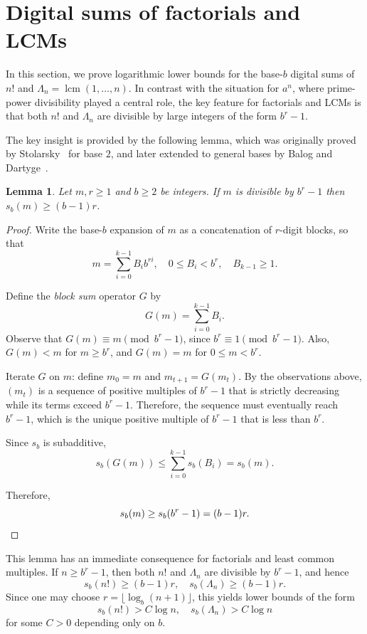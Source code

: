 \documentclass[12pt]{amsart}
\newtheorem{lemma}{Lemma}
\theoremstyle{remark}
\DeclareMathOperator{\lcm}{lcm}
\begin{document}
\section{Digital sums of factorials and LCMs}
\label{sec:digital-sums-factorials-lcms}
In this section, we prove logarithmic lower bounds for the base-$b$
digital sums of $n!$ and $\Lambda_n = \lcm(1,\ldots, n)$.
In contrast with the situation for $a^n$, where prime-power divisibility
played a central role, the key feature for factorials and LCMs
is that both $n!$ and $\Lambda_n$ are divisible by large integers
of the form $b^r - 1$.

The key insight is provided by the following lemma, which was
originally proved by Stolarsky~\cite{stolarsky1980} for base $2$,
and later extended to general bases by Balog and Dartyge~\cite{balog-dartyge2012}.

\begin{lemma} \label{lem:balog}
    Let $m, r \ge 1$ and $b \ge 2$ be integers.
    If $m$ is divisible by $b^r - 1$ then $s_b(m) \ge (b-1)r$.
\end{lemma}

\begin{proof}
    Write the base-$b$ expansion of $m$ as a concatenation of $r$-digit blocks,
    so that
    \[
        m = \sum_{i=0}^{k-1} B_i b^{ri}, \quad 0 \le B_i < b^r, \quad B_{k-1} \ge 1.
    \]

    Define the \emph{block sum} operator $G$ by
    \[
        G(m) = \sum_{i=0}^{k-1} B_i.
    \]
    Observe that
    $G(m) \equiv m \pmod{b^r - 1}$, since $b^r \equiv 1 \pmod{b^r - 1}$.
    Also, $G(m) < m$ for $m \ge b^r$, and $G(m) = m$ for $0 \le m < b^r$.

    Iterate $G$ on $m$: define $m_0 = m$ and $m_{t+1} = G(m_t)$.
    By the observations above, $(m_t)$ is a sequence of
    positive multiples of $b^r - 1$ that is strictly decreasing
    while its terms exceed $b^r - 1$.
    Therefore, the sequence must eventually reach $b^r - 1$,
    which is the unique positive multiple of $b^r - 1$ that is less than $b^r$.

    Since $s_b$ is subadditive,
    \[
        s_b(G(m)) \le \sum_{i=0}^{k-1} s_b(B_i) = s_b(m).
    \]

    Therefore,
    \[
        s_b(m) \ge s_b(b^r - 1) = (b-1)r. \qedhere
    \]
\end{proof}

This lemma has an immediate consequence for factorials and least common multiples.
If $n \ge b^r - 1$, then both $n!$ and $\Lambda_n$ are divisible by $b^r - 1$,
and hence
\[
    s_b(n!) \ge (b-1)r, \quad s_b(\Lambda_n) \ge (b-1)r.
\]
Since one may choose $r = \lfloor \log_b (n+1) \rfloor$, this yields
lower bounds of the form
\[
    s_b(n!) > C \log n, \quad s_b(\Lambda_n) > C \log n
\]
for some $C > 0$ depending only on $b$.
\end{document}
